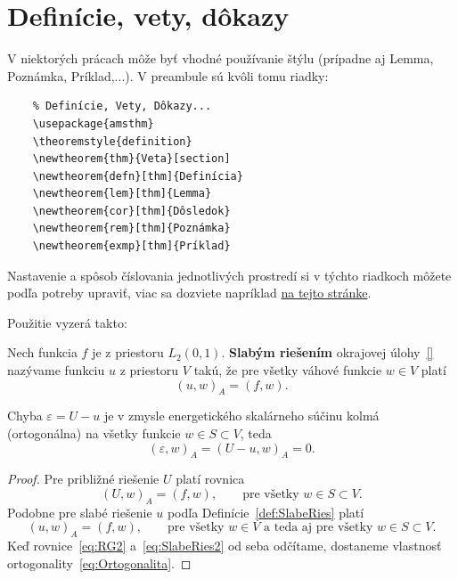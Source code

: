 \section{Definície, vety, dôkazy}
V niektorých prácach môže byť vhodné používanie štýlu  (prípadne aj Lemma, Poznámka, Príklad,...). V preambule sú kvôli tomu riadky:
\begin{verbatim}
	% Definície, Vety, Dôkazy...
	\usepackage{amsthm}
	\theoremstyle{definition}
	\newtheorem{thm}{Veta}[section]
	\newtheorem{defn}[thm]{Definícia}
	\newtheorem{lem}[thm]{Lemma}
	\newtheorem{cor}[thm]{Dôsledok}
	\newtheorem{rem}[thm]{Poznámka}
	\newtheorem{exmp}[thm]{Príklad}
\end{verbatim}
Nastavenie a spôsob číslovania jednotlivých prostredí si v týchto riadkoch môžete podľa potreby upraviť, viac sa dozviete napríklad \href{https://www.overleaf.com/learn/latex/Theorems_and_proofs}{na tejto stránke}.

Použitie vyzerá takto:

\begin{defn}\label{def:SlabeRies}
	Nech funkcia $f$ je z priestoru $L_2(0,1)$. \textbf{Slabým riešením} okrajovej úlohy~\eqref{} nazývame funkciu $u$ z priestoru $V$ takú, že pre všetky váhové funkcie $w\in V$ platí
	\begin{equation*}
		(u,w)_A=(f,w).
	\end{equation*}
\end{defn}


\begin{thm}
	Chyba  $\varepsilon=U-u$ je v zmysle energetického skalárneho súčinu kolmá (ortogonálna) na všetky funkcie $w\in S \subset V$, teda
	\begin{equation}\label{eq:Ortogonalita}
		(\varepsilon,w)_A=(U-u,w)_A=0.
	\end{equation}
\end{thm}
\begin{proof}
	Pre približné riešenie $U$ platí rovnica
	\begin{equation}\label{eq:RG2}
		(U,w)_A=(f,w),\qquad \mbox{pre všetky } w \in S\subset V.
	\end{equation}
	Podobne pre slabé riešenie $u$ podľa Definície~\ref{def:SlabeRies} platí
	\begin{equation}\label{eq:SlabeRies2}
		(u,w)_A=(f,w),\qquad \mbox{pre všetky } w \in V \mbox{ a teda aj pre všetky } w \in S\subset V.
	\end{equation}
	Keď rovnice~\eqref{eq:RG2} a~\eqref{eq:SlabeRies2} od seba odčítame, dostaneme vlastnosť ortogonality~\eqref{eq:Ortogonalita}.
\end{proof}

